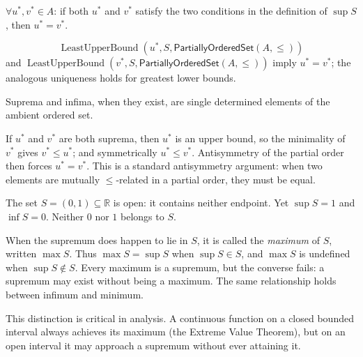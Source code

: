\begin{remark*}
$\forall u^*, v^* \in A$: if both $u^*$ and $v^*$ satisfy the two conditions
in the definition of $\sup S$, then $u^* = v^*$.
\end{remark*}

\begin{remark*}
\[
  \operatorname{LeastUpperBound}(u^*,S,\mathsf{PartiallyOrderedSet}(A,\leq))
\]
and $\operatorname{LeastUpperBound}(v^*,S,\mathsf{PartiallyOrderedSet}(A,\leq))$
imply $u^*=v^*$; the analogous uniqueness holds for greatest lower bounds.
\end{remark*}

\begin{remark*}[Interpretation]
Suprema and infima, when they exist, are single determined elements of the
ambient ordered set.
\end{remark*}

\begin{remark*}[Exposition]
If $u^*$ and $v^*$ are both suprema, then $u^*$ is an upper bound, so
the minimality of $v^*$ gives $v^* \leq u^*$; and symmetrically $u^* \leq v^*$.
Antisymmetry of the partial order then forces $u^* = v^*$.  This is a
standard antisymmetry argument: when two elements are mutually $\leq$-related
in a partial order, they must be equal.
\end{remark*}


\begin{remark*}[Exposition]
The set $S = (0,1) \subseteq \mathbb{R}$ is open: it contains neither
endpoint.  Yet $\sup S = 1$ and $\inf S = 0$.  Neither $0$ nor $1$
belongs to $S$.

When the supremum does happen to lie in $S$, it is called the
\emph{maximum} of $S$, written $\max S$.  Thus $\max S = \sup S$ when
$\sup S \in S$, and $\max S$ is undefined when $\sup S \notin S$.
Every maximum is a supremum, but the converse fails: a supremum may
exist without being a maximum.  The same relationship holds between
infimum and minimum.

This distinction is critical in analysis.  A continuous function on a
closed bounded interval always achieves its maximum (the Extreme Value
Theorem), but on an open interval it may approach a supremum without
ever attaining it.
\end{remark*}

